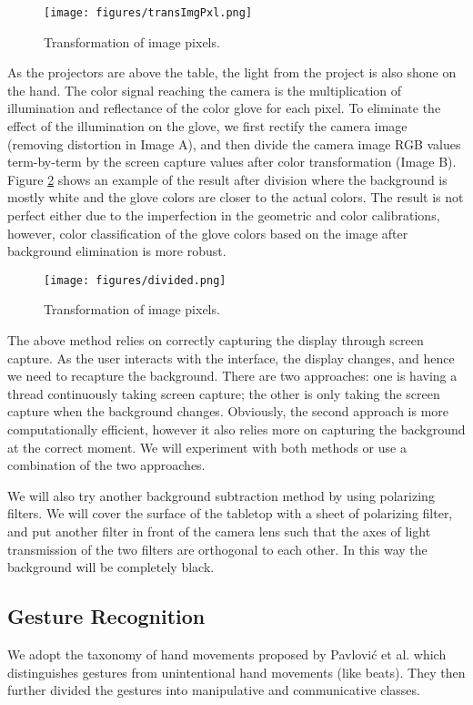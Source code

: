 \begin{figure}
	\centering
	\texttt{[image: figures/transImgPxl.png]} 
	\caption{Transformation of image pixels.} \label{fig:transImgPxl}
\end{figure}

As the projectors are above the table, the light from the project is also shone on the hand. The color signal reaching the camera is the multiplication of illumination and reflectance of the color glove for each pixel. To eliminate the effect of the illumination on the glove, we first rectify the camera image (removing distortion in Image A), and then divide the camera image RGB values term-by-term by the screen capture values after color transformation (Image B). Figure \ref{fig:divided} shows an example of the result after division where the background is mostly white and the glove colors are closer to the actual colors. The result is not perfect either due to the imperfection in the geometric and color calibrations, however, color classification of the glove colors based on the image after background elimination is more robust.

\begin{figure}
	\centering
	\texttt{[image: figures/divided.png]} 
	\caption{Transformation of image pixels.} \label{fig:divided}
\end{figure}

The above method relies on correctly capturing the display through screen capture. As the user interacts with the interface, the display changes, and hence we need to recapture the background. There are two approaches: one is having a thread continuously taking screen capture; the other is only taking the screen capture when the background changes. Obviously, the second approach is more computationally efficient, however it also relies more on capturing the background at the correct moment. We will experiment with both methods or use a combination of the two approaches.

We will also try another background subtraction method by using polarizing filters. We will cover the surface of the tabletop with a sheet of polarizing filter, and put another filter in front of the camera lens such that the axes of light transmission of the two filters are orthogonal to each other. In this way the background will be completely black.
   
\subsection{Gesture Recognition}
We adopt the taxonomy of hand movements proposed by Pavlovi\'{c} et al. \cite{Pavlovic97} which distinguishes gestures from unintentional hand movements (like beats). They then further divided the gestures into manipulative and communicative classes. 

